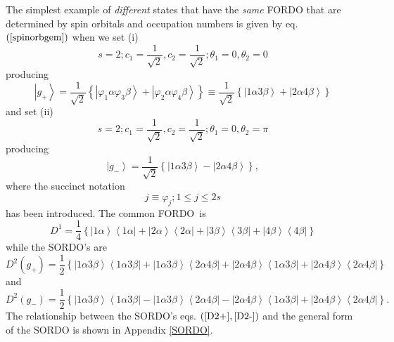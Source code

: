 \documentclass[aps,preprint]{revtex4}%
\begin{document}
The simplest example of \emph{different} states that have the \emph{same}
FORDO that are determined by spin orbitals and occupation numbers is given by
eq. $\left(  \ref{spinorbgem}\right)  $ when we set (i)
\begin{equation}
s=2;c_{1}=\frac{1}{\sqrt{2}},c_{2}=\frac{1}{\sqrt{2}};\theta_{1}=0,\theta
_{2}=0
\end{equation}
producing%
\begin{equation}
\left\vert g_{+}\right\rangle =\frac{1}{\sqrt{2}}\left\{  \left\vert
\varphi_{1}\alpha\varphi_{3}\beta\right\rangle +\left\vert \varphi_{2}%
\alpha\varphi_{4}\beta\right\rangle \right\}  \equiv\frac{1}{\sqrt{2}}\left\{
\left\vert 1\alpha3\beta\right\rangle +\left\vert 2\alpha4\beta\right\rangle
\right\}  \label{ex1}%
\end{equation}
and set (ii)
\begin{equation}
s=2;c_{1}=\frac{1}{\sqrt{2}},c_{2}=\frac{1}{\sqrt{2}};\theta_{1}=0,\theta
_{2}=\pi
\end{equation}
producing
\begin{equation}
\left\vert g_{-}\right\rangle =\frac{1}{\sqrt{2}}\left\{  \left\vert
1\alpha3\beta\right\rangle -\left\vert 2\alpha4\beta\right\rangle \right\}  ,
\label{ex2}%
\end{equation}
where the succinct notation
\begin{equation}
j\equiv\varphi_{j};1\leq j\leq2s
\end{equation}
has been introduced. The common FORDO\ is
\begin{equation}
D^{1}=\frac{1}{4}\left\{  \left\vert 1\alpha\right\rangle \left\langle
1\alpha\right\vert +\left\vert 2\alpha\right\rangle \left\langle
2\alpha\right\vert +\left\vert 3\beta\right\rangle \left\langle 3\beta
\right\vert +\left\vert 4\beta\right\rangle \left\langle 4\beta\right\vert
\right\}  \label{D1+-}%
\end{equation}
while the SORDO's are
\begin{equation}
D^{2}\left(  g_{+}\right)  =\frac{1}{2}\left\{  \left\vert 1\alpha
3\beta\right\rangle \left\langle 1\alpha3\beta\right\vert +\left\vert
1\alpha3\beta\right\rangle \left\langle 2\alpha4\beta\right\vert +\left\vert
2\alpha4\beta\right\rangle \left\langle 1\alpha3\beta\right\vert +\left\vert
2\alpha4\beta\right\rangle \left\langle 2\alpha4\beta\right\vert \right\}
\label{D2+}%
\end{equation}
and
\begin{equation}
D^{2}\left(  g_{-}\right)  =\frac{1}{2}\left\{  \left\vert 1\alpha
3\beta\right\rangle \left\langle 1\alpha3\beta\right\vert -\left\vert
1\alpha3\beta\right\rangle \left\langle 2\alpha4\beta\right\vert -\left\vert
2\alpha4\beta\right\rangle \left\langle 1\alpha3\beta\right\vert +\left\vert
2\alpha4\beta\right\rangle \left\langle 2\alpha4\beta\right\vert \right\}  .
\label{D2-}%
\end{equation}
The relationship between the SORDO's eqs. $\left(  \ref{D2+},\ref{D2-}\right)
$ and the general form of the SORDO is shown in Appendix \ref{SORDO}.
\end{document}
